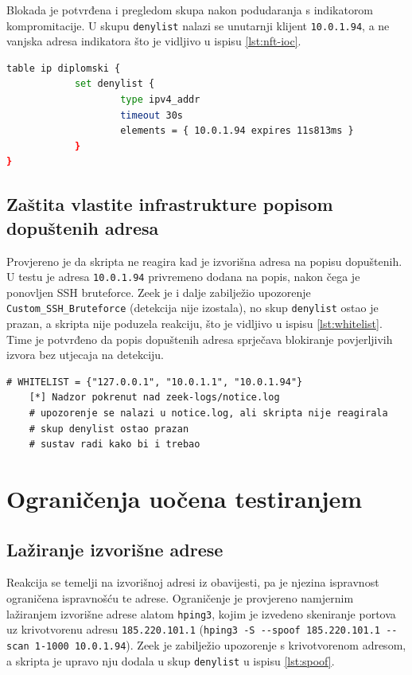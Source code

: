 Blokada je potvrđena i pregledom skupa nakon podudaranja s indikatorom kompromitacije. U skupu \texttt{denylist} nalazi se unutarnji klijent
\texttt{10.0.1.94}, a ne vanjska adresa indikatora što je vidljivo u ispisu \ref{lst:nft-ioc}.

\begin{lstlisting}[language=bash, caption={Skup \texttt{denylist} nakon podudaranja s indikatorom kompromitacije},label={lst:nft-ioc}]
    table ip diplomski {
            set denylist {
                    type ipv4_addr
                    timeout 30s
                    elements = { 10.0.1.94 expires 11s813ms }
            }
}
\end{lstlisting}

\subsection{Zaštita vlastite infrastrukture popisom dopuštenih adresa}

Provjereno je da skripta ne reagira kad je izvorišna adresa na popisu dopuštenih. U testu je adresa \texttt{10.0.1.94} privremeno dodana na popis,
nakon čega je ponovljen SSH bruteforce. Zeek je i dalje zabilježio upozorenje \texttt{Custom\_SSH\_Bruteforce} (detekcija nije izostala), no skup
\texttt{denylist} ostao je prazan, a skripta nije poduzela reakciju, što je vidljivo u ispisu \ref{lst:whitelist}. Time je potvrđeno da popis dopuštenih adresa
sprječava blokiranje povjerljivih izvora bez utjecaja na detekciju.

\begin{lstlisting}[caption={Detekcija bez reakcije za adresu na popisu dopuštenih}, label={lst:whitelist}]
    # WHITELIST = {"127.0.0.1", "10.0.1.1", "10.0.1.94"}
    [*] Nadzor pokrenut nad zeek-logs/notice.log
    # upozorenje se nalazi u notice.log, ali skripta nije reagirala
    # skup denylist ostao prazan
    # sustav radi kako bi i trebao
\end{lstlisting}

\section{Ograničenja uočena testiranjem}

\subsection{Lažiranje izvorišne adrese}

Reakcija se temelji na izvorišnoj adresi iz obavijesti, pa je njezina ispravnost ograničena ispravnošću te adrese. Ograničenje je provjereno
namjernim lažiranjem izvorišne adrese alatom \texttt{hping3}, kojim je izvedeno skeniranje portova uz krivotvorenu adresu \texttt{185.220.101.1}
(\texttt{hping3 -S -{}-spoof 185.220.101.1 -{}-scan 1-1000 10.0.1.94}). Zeek je zabilježio upozorenje s krivotvorenom adresom, a skripta je upravo nju dodala u
skup \texttt{denylist} u ispisu \ref{lst:spoof}.

